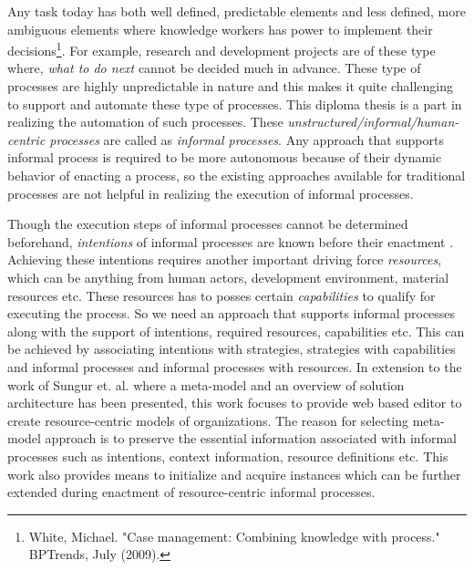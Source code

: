 Any task today has both well defined, predictable elements and less defined, more ambiguous elements where knowledge workers has power to implement their decisions\footnote{White, Michael. "Case management: Combining knowledge with process." BPTrends, July (2009).}. For example, research and development projects are of these type where, \textit{what to do next} cannot be decided much in advance. These type of processes are highly unpredictable in nature and this makes it quite challenging to support and automate these type of processes. This diploma thesis is a part in realizing the automation of such processes. These \textit{unstructured/informal/human-centric processes} are called as \textit{informal processes}\cite{Sungur2014}. Any approach that supports informal process is required to be more autonomous because of their dynamic behavior of enacting a process, so the existing approaches available for traditional processes are not helpful in realizing the execution of informal processes.  


Though the execution steps of informal processes cannot be determined beforehand, \textit{intentions} of informal processes are known before their enactment \cite{Sungur2015}. Achieving these intentions requires another important driving force \textit{resources}, which can be anything from human actors, development environment, material resources etc. These resources has to posses certain \textit{capabilities} to qualify for executing the process. So we need an approach that supports informal processes along with the support of intentions, required resources, capabilities etc. This can be achieved by associating intentions with strategies, strategies with capabilities and informal processes and informal processes with resources. In extension to the work of Sungur et. al. \cite{Sungur2014a} where a meta-model and an overview of solution architecture has been presented, this work  focuses to provide web based  editor to create resource-centric models of organizations. The reason for selecting meta-model approach is to preserve the essential information associated with informal processes such as intentions, context information, resource definitions etc.  This work also provides means to initialize and acquire instances which can be further extended during enactment of resource-centric informal processes.  


